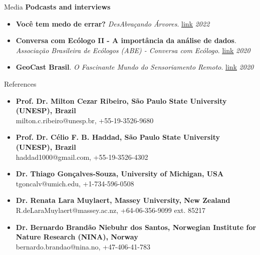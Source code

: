 \documentclass{resume}
\begin{document}
\begin{rSection}{Media}
{\bf Podcasts and interviews}
\begin{itemize} 
\item {\bf Você tem medo de errar?} {\it DesAbraçando Árvores}. \href{https://www.desabrace.com.br/092-voce-tem-medo-de-errar/}{\underline{link}} \hfill{\em 2022} 
\item {\bf Conversa com Ecólogo II - A importância da análise de dados}. {\it Associação Brasileira de Ecólogos (ABE) - Conversa com Ecólogo}. \href{https://www.instagram.com/p/CFQVjMtH6qk/}{\underline{link}} \hfill{\em 2020}
\item {\bf GeoCast Brasil}. {\it O Fascinante Mundo do Sensoriamento Remoto}. \href{https://open.spotify.com/episode/0Kn5k9039vM8bZgb4YdlJJ?si=S5hfhNc6S6GfDFaJSsaQDA}{\underline{link}} \hfill{\em 2020}
\end{itemize} 

\end{rSection}


\begin{rSection}{References}
\begin{itemize}
\item {\bf Prof. Dr. Milton Cezar Ribeiro, São Paulo State University (UNESP), Brazil} 
\\ milton.c.ribeiro@unesp.br, +55-19-3526-9680
\item {\bf Prof. Dr. Célio F. B. Haddad, São Paulo State University (UNESP), Brazil} 
\\ haddad1000@gmail.com, +55-19-3526-4302
\item {\bf Dr. Thiago Gonçalves-Souza, University of Michigan, USA} 
\\ tgoncalv@umich.edu, +1-734-596-0508
\item {\bf Dr. Renata Lara Muylaert, Massey University, New Zealand} 
\\ R.deLaraMuylaert@massey.ac.nz, +64-06-356-9099 ext. 85217
\item {\bf Dr. Bernardo Brandão Niebuhr dos Santos, Norwegian Institute for Nature Research (NINA), Norway} 
\\ bernardo.brandao@nina.no, +47-406-41-783
\end{itemize}
\end{rSection}
\end{document}
